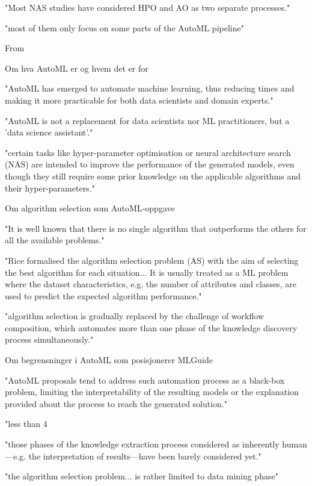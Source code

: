 "Most NAS studies have considered HPO and AO as two separate processes."

"most of them only focus on some parts of the AutoML pipeline"

From \parencite{barbudo2023eight_years_automl_categorisation_review_trends} 

Om hva AutoML er og hvem det er for

"AutoML has emerged to automate machine learning, thus reducing times and making it more practicable for both data scientists and domain experts."

"AutoML is not a replacement for data scientists nor ML practitioners, but a 'data science assistant'."

"certain tasks like hyper-parameter optimisation or neural architecture search (NAS) are intended to improve the performance of the generated models, even though they still require some prior knowledge on the applicable algorithms and their hyper-parameters."

Om algorithm selection som AutoML-oppgave

"It is well known that there is no single algorithm that outperforms the others for all the available problems."

"Rice formalised the algorithm selection problem (AS) with the aim of selecting the best algorithm for each situation... It is usually treated as a ML problem where the dataset characteristics, e.g. the number of attributes and classes, are used to predict the expected algorithm performance."

"algorithm selection is gradually replaced by the challenge of workflow composition, which automates more than one phase of the knowledge discovery process simultaneously."

Om begrensninger i AutoML som posisjonerer MLGuide

"AutoML proposals tend to address such automation process as a black-box problem, limiting the interpretability of the resulting models or the explanation provided about the process to reach the generated solution."

"less than 4%

"those phases of the knowledge extraction process considered as inherently human—e.g. the interpretation of results—have been barely considered yet."

"the algorithm selection problem... is rather limited to data mining phase"